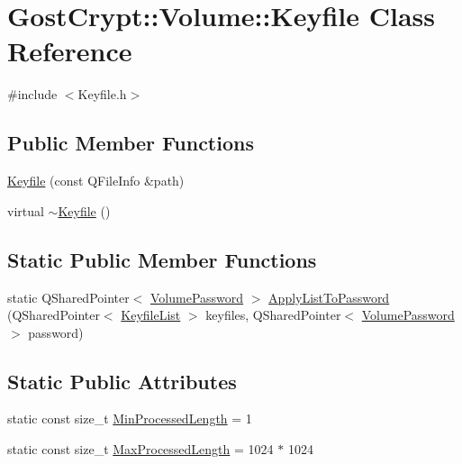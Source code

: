 \hypertarget{class_gost_crypt_1_1_volume_1_1_keyfile}{}\section{Gost\+Crypt\+:\+:Volume\+:\+:Keyfile Class Reference}
\label{class_gost_crypt_1_1_volume_1_1_keyfile}


{\ttfamily \#include $<$Keyfile.\+h$>$}

\subsection*{Public Member Functions}
\begin{DoxyCompactItemize}
\item 
\hyperlink{class_gost_crypt_1_1_volume_1_1_keyfile_ac06d59d9ea45d099d296732622bcb004}{Keyfile} (const Q\+File\+Info \&path)
\item 
virtual \hyperlink{class_gost_crypt_1_1_volume_1_1_keyfile_ae3de2997702e1d6eca91fe2eb08ef14d}{$\sim$\+Keyfile} ()
\end{DoxyCompactItemize}
\subsection*{Static Public Member Functions}
\begin{DoxyCompactItemize}
\item 
static Q\+Shared\+Pointer$<$ \hyperlink{class_gost_crypt_1_1_volume_1_1_volume_password}{Volume\+Password} $>$ \hyperlink{class_gost_crypt_1_1_volume_1_1_keyfile_a1493100ce01d801c5f11aa66f324efcf}{Apply\+List\+To\+Password} (Q\+Shared\+Pointer$<$ \hyperlink{namespace_gost_crypt_1_1_volume_af2dce083ae31a8d22257d609e924963d}{Keyfile\+List} $>$ keyfiles, Q\+Shared\+Pointer$<$ \hyperlink{class_gost_crypt_1_1_volume_1_1_volume_password}{Volume\+Password} $>$ password)
\end{DoxyCompactItemize}
\subsection*{Static Public Attributes}
\begin{DoxyCompactItemize}
\item 
static const size\+\_\+t \hyperlink{class_gost_crypt_1_1_volume_1_1_keyfile_af969985bceb0b13080c438e82c76ec08}{Min\+Processed\+Length} = 1
\item 
static const size\+\_\+t \hyperlink{class_gost_crypt_1_1_volume_1_1_keyfile_a3ba0bae9093d388569e2e6652fdd22fb}{Max\+Processed\+Length} = 1024 $\ast$ 1024
\end{DoxyCompactItemize}
